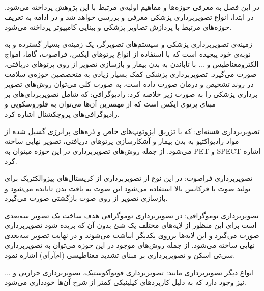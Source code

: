 

در این فصل به معرفی حوزه‌ها و مفاهیم اولیه‌ی مرتبط با این پژوهش پرداخته می‌شود. در ابتدا، انواع تصویربرداری پزشکی معرفی و بررسی خواهد شد و در ادامه به تعریف حوزه‌های مرتبط با پردازش تصاویر پزشکی و بینایی کامپیوتر پرداخته می‌شود.



زمینه‌ی تصویربرداری پزشکی و سیستم‌های تصویرگر، یک زمینه‌ی بسیار گسترده و به نوبه‌ی خود پیچیده است که با استفاده از انواع پرتوهای ایکس، فراصوت، گاما، امواج الکترومغناطیس و ... با تاباندن به بدن بیمار و بازسازی تصویر از روی پرتوهای دریافتی، صورت می‌‌گیرد. تصویربرداری پزشکی کمک بسیار زیادی به متخصصین حوزه‌ی سلامت در روند تشخیص و درمان صورت داده است، به صورت کلی می‌توان روش‌های تصویر برداری پزشکی را به صورت زیر خلاصه کرد:
 رادیوگرافی: که شامل تصویربردای‌های بر مبنای پرتوی ایکس است که از مهمترین آن‌ها می‌توان به فلوروسکوپی و رادیوگرافی‌های پروجکشنال اشاره کرد.

 تصویربرداری هسته‌ای: که با تزریق ایزوتوپ‌های خاص و ذره‌های پرانرژی گسیل شده از مواد رادیواکتیو به بدن بیمار و آشکارسازی پرتوهای دریافتی، تصویر نهایی ساخته می‌شود. از جمله روش‌های تصویربرداری در این حوزه میتوان به PET  و SPECT  اشاره کرد.

 تصویربرداری فراصوت: در این نوع از تصویربرداری از کریستال‌های پیزوالکتریک برای تولید صوت با فرکانس بالا استفاده می‌شود این صوت به بافت بدن تابانده می‌شود و بازسازی تصویر از روی صوت بازگشتی صورت می‌گیرد. 

 تصویربرداری توموگرافی: در تصویربرداری توموگرافی هدف ساخت یک تصویر سه‌بعدی است برای این منظور از لایه‌های مختلف یک شئ بدون آن که بریده شود تصویربرداری صورت می‌گیرد و این لایه‌ها برروی یکدیگر انباشت می‌شوند و در نهایت تصویر سه‌بعدی نهایی ساخته می‌شود. از جمله روش‌های موجود در این حوزه می‌توان به تصویربرداری سی‌تی اسکن و تصویربرداری بر مبنای تشدید مغناطیسی (ام‌آرآی) اشاره نمود.

 انواع دیگر تصویربرداری مانند: تصویربرداری فوتوآکوستیک، تصویربرداری حرارتی و ... نیز وجود دارد که به دلیل کاربردهای کیلینیکی کمتر از شرح آن‌ها خودداری می‌شود.


